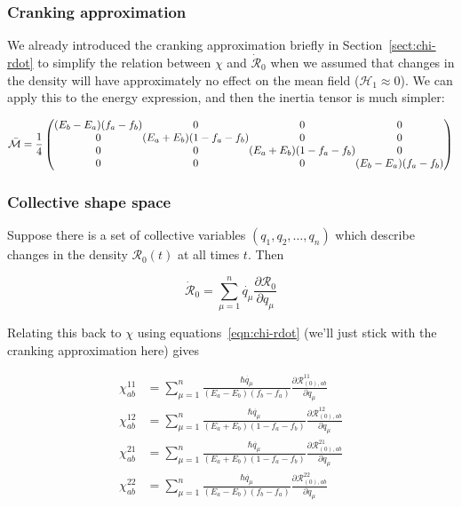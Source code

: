 \subsubsection{Cranking approximation}

We already introduced the cranking approximation briefly in Section~\ref{sect:chi-rdot} to simplify the relation between $\chi$ and $\mathcal{\dot{R}}_0$ when we assumed that changes in the density will have approximately no effect on the mean field ($\mathcal{H}_1 \approx 0$). We can apply this to the energy expression, and then the inertia tensor is much simpler:

\begin{equation}\label{eqn:cranked_ATDHFB}
\mathcal{\bar{M}} = \frac{1}{4}\left(\begin{array}{@{}c@{}c@{}c@{}c@{}}
(E_b-E_a)(f_a-f_b) & 0                     & 0                     & 0 \\
0                  & (E_a+E_b)(1-f_a-f_b) & 0                     & 0 \\
0                  & 0                     & (E_a+E_b)(1-f_a-f_b)  & 0 \\
0                  & 0                     & 0                     & (E_b-E_a)(f_a-f_b)
\end{array}\right)
\end{equation}

\subsubsection{Collective shape space}

Suppose there is a set of collective variables $(q_1,q_2,\dots,q_n)$ which describe changes in the density $\mathcal{R}_0(t)$ at all times $t$. Then

\begin{equation}
\mathcal{\dot{R}}_0 = \sum_{\mu=1}^{n}\dot{q_\mu}\frac{\partial\mathcal{R}_0}{\partial q_\mu}
\end{equation}

\noindent Relating this back to $\chi$ using equations~\eqref{eqn:chi-rdot} (we'll just stick with the cranking approximation here) gives

\begin{align}
\chi^{11}_{ab} &= \sum_{\mu=1}^{n}\frac{\hbar\dot{q_\mu}}{(E_a-E_b)(f_b-f_a)}\frac{\partial\mathcal{R}^{11}_{(0),ab}}{\partial q_\mu} \\
\chi^{12}_{ab} &= \sum_{\mu=1}^{n}\frac{\hbar\dot{q_\mu}}{(E_a+E_b)(1-f_a-f_b)}\frac{\partial\mathcal{R}^{12}_{(0),ab}}{\partial q_\mu} \\
\chi^{21}_{ab} &= \sum_{\mu=1}^{n}\frac{\hbar\dot{q_\mu}}{(E_a+E_b)(1-f_a-f_b)}\frac{\partial\mathcal{R}^{21}_{(0),ab}}{\partial q_\mu} \\
\chi^{22}_{ab} &= \sum_{\mu=1}^{n}\frac{\hbar\dot{q_\mu}}{(E_a-E_b)(f_b-f_a)}\frac{\partial\mathcal{R}^{22}_{(0),ab}}{\partial q_\mu} \\
\end{align}

